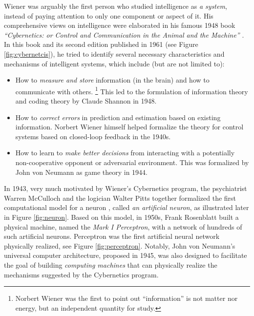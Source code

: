 \documentclass[../../book-main.tex]{subfiles}
\begin{document}
Wiener was arguably the first person who studied intelligence as {\em a system}, instead of paying attention to only one component or aspect of it. His comprehensive views on intelligence were elaborated in his famous 1948 book {\em ``Cybernetics: or Control and Communication in the Animal and the Machine''} \cite{Wiener-Cybernetics-1948}. In this book and its second edition published in 1961 \cite{Wiener-Cybernetics-1961} (see Figure \ref{fig:cybernetcis}), he tried to identify several necessary characteristics and mechanisms of intelligent systems, which include (but are not limited to):
\begin{itemize}
    \item How to {\em measure and store} information (in the brain) and how to communicate with others. \footnote{Norbert Wiener was the first to point out ``information'' is not matter nor energy, but an independent quantity for study.} This led to the formulation of information theory and coding theory by Claude Shannon in 1948.
    \item How to {\em correct errors}  in prediction and estimation based on existing information. Norbert Wiener himself helped formalize the theory for control systems based on closed-loop feedback in the 1940s. 
    \item How to learn to {\em make better decisions} from interacting with a potentially non-cooperative opponent or adversarial environment. This was formalized by John von Neumann as game theory in 1944. 
\end{itemize}
In 1943, very much motivated by Wiener's Cybernetics program, the psychiatrist Warren McCulloch and the logician Walter Pitts together formalized the first computational model for a neuron \cite{McCulloch-Pitts}, called {\em an artificial neuron}, as illustrated later in Figure \ref{fig:neuron}. Based on this model, in 1950s, Frank Rosenblatt built a physical machine, named the {\em Mark I Perceptron}, with a network of hundreds of such artificial neurons. Perceptron was the first artificial neural network physically realized, see Figure \ref{fig:perceptron}. Notably, John von Neumann's universal computer architecture, proposed in 1945, was also designed to facilitate the goal of building {\em computing machines} that can physically realize the mechanisms suggested by the Cybernetics program. 
\end{document}
